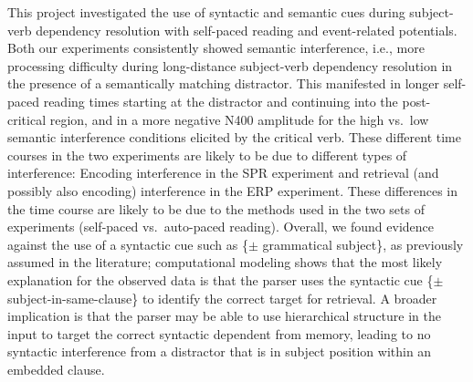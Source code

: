 \documentclass[a4paper, man, floatsintext]{apa7}
\begin{document}
This project investigated the use of  syntactic and semantic cues during subject-verb dependency resolution with self-paced reading and event-related potentials.  Both our experiments consistently showed semantic interference, i.e., more processing difficulty during long-distance subject-verb dependency resolution in the presence of a semantically matching distractor. This manifested in longer self-paced reading times starting at the distractor and continuing into the post-critical region, and in a more negative N400 amplitude for the high vs.\ low semantic interference conditions elicited by the critical verb. These different time courses in the two experiments are likely to be due to different types of interference: Encoding interference in the SPR experiment and retrieval (and possibly also encoding) interference in the ERP experiment. These differences in the time course are likely to be due to the methods used in the two sets of experiments (self-paced vs.\ auto-paced reading). Overall, we found evidence against the use of a syntactic cue such as \{$\pm$ grammatical subject\}, as previously assumed in the literature; computational modeling shows that the most likely explanation for the observed data is that the parser uses the syntactic cue  \{$\pm$ subject-in-same-clause\}  to identify the correct target for retrieval.  A broader implication is that the parser may be able to use hierarchical structure in the input to target the correct syntactic dependent from memory, leading to no syntactic interference from a distractor that is in subject position within an embedded clause.




\newpage
\printbibliography


\end{document}
